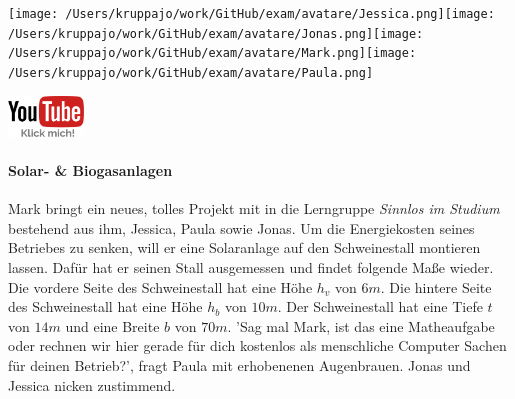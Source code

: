 \documentclass[a4paper, 9pt]{scrartcl}\usepackage[]{graphicx}\usepackage[]{xcolor}
\begin{document}
 
\ifcollection
\begin{flushright}
\tiny\vspace{-3Ex}
\textbf{\examinhaltstart}
\exammodulemathstat
\vspace{-4Ex}
\end{flushright}
\begin{minipage}[t]{0.5\textwidth}
\texttt{[image: /Users/kruppajo/work/GitHub/exam/avatare/Jessica.png]}\hspace{-4mm}\texttt{[image: /Users/kruppajo/work/GitHub/exam/avatare/Jonas.png]}\hspace{-4mm}\texttt{[image: /Users/kruppajo/work/GitHub/exam/avatare/Mark.png]}\hspace{-4mm}\texttt{[image: /Users/kruppajo/work/GitHub/exam/avatare/Paula.png]}
\end{minipage}
\begin{minipage}[t]{0.5\textwidth}
\hfill
\href{https://youtu.be/aBxLkdF-c4M}{\includegraphics[width = 2cm]{img/youtube}}
\end{minipage}
\fi




\ifcollection
\paragraph{Solar- \& Biogasanlagen}
\fi



Mark bringt ein neues, tolles Projekt mit in die Lerngruppe \textit{Sinnlos im Studium} bestehend aus ihm, Jessica, Paula sowie Jonas. Um die Energiekosten seines Betriebes zu senken, will er eine Solaranlage auf den Schweinestall montieren lassen. Dafür hat er seinen Stall ausgemessen und findet folgende Maße wieder. Die vordere Seite des Schweinestall hat eine Höhe $h_v$ von $6m$. Die hintere Seite des Schweinestall hat eine Höhe $h_b$ von $10m$. Der Schweinestall hat eine Tiefe $t$ von $14m$ und eine Breite $b$ von $70m$. 'Sag mal Mark, ist das eine Matheaufgabe oder rechnen wir hier gerade für dich kostenlos als menschliche Computer Sachen für deinen Betrieb?', fragt Paula mit erhobenenen Augenbrauen. Jonas und Jessica nicken zustimmend.

\vspace{1Ex}
\end{document}
